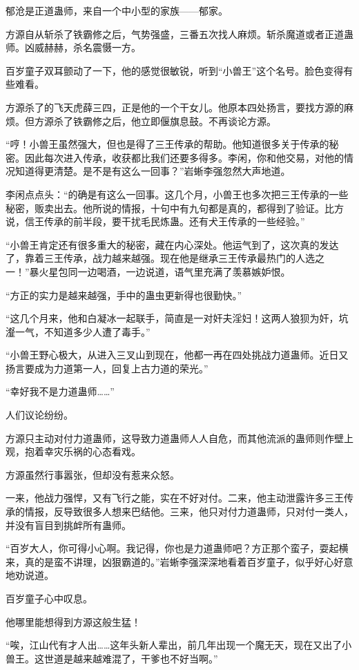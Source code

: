 \begin{this_body}
郁沧是正道蛊师，来自一个中小型的家族——郁家。

方源自从斩杀了铁霸修之后，气势强盛，三番五次找人麻烦。斩杀魔道或者正道蛊师。凶威赫赫，杀名震慑一方。

百岁童子双耳颤动了一下，他的感觉很敏锐，听到“小兽王”这个名号。脸色变得有些难看。

方源杀了的飞天虎薛三四，正是他的一个干女儿。他原本四处扬言，要找方源的麻烦。但方源杀了铁霸修之后，他立即偃旗息鼓。不再谈论方源。

“哼！小兽王虽然强大，但也是得了三王传承的帮助。他知道很多关于传承的秘密。因此每次进入传承，收获都比我们还要多得多。李闲，你和他交易，对他的情况知道得更清楚。是不是有这么一回事？”岩蜥李强忽然大声地道。

李闲点点头：“的确是有这么一回事。这几个月，小兽王也多次把三王传承的一些秘密，贩卖出去。他所说的情报，十句中有九句都是真的，都得到了验证。比方说，信王传承的前半段，要干扰毛民炼蛊。还有犬王传承的一些经验。”

“小兽王肯定还有很多重大的秘密，藏在内心深处。他运气到了，这次真的发达了，靠着三王传承，战力越来越强。现在他是继承三王传承最热门的人选之一！”暴火星包同一边喝酒，一边说道，语气里充满了羡慕嫉妒恨。

“方正的实力是越来越强，手中的蛊虫更新得也很勤快。”

“这几个月来，他和白凝冰一起联手，简直是一对奸夫淫妇！这两人狼狈为奸，坑瀣一气，不知道多少人遭了毒手。”

“小兽王野心极大，从进入三叉山到现在，他都一再在四处挑战力道蛊师。近日又扬言要成为力道第一人，回复上古力道的荣光。”

“幸好我不是力道蛊师……”

人们议论纷纷。

方源只主动对付力道蛊师，这导致力道蛊师人人自危，而其他流派的蛊师则作壁上观，抱着幸灾乐祸的心态看戏。

方源虽然行事嚣张，但却没有惹来众怒。

一来，他战力强悍，又有飞行之能，实在不好对付。二来，他主动泄露许多三王传承的情报，反导致很多人想来巴结他。三来，他只对付力道蛊师，只对付一类人，并没有盲目到挑衅所有蛊师。

“百岁大人，你可得小心啊。我记得，你也是力道蛊师吧？方正那个蛮子，耍起横来，真的是蛮不讲理，凶狠霸道的。”岩蜥李强深深地看着百岁童子，似乎好心好意地劝说道。

百岁童子心中叹息。

他哪里能想得到方源这般生猛！

“唉，江山代有才人出……这年头新人辈出，前几年出现一个魔无天，现在又出了小兽王。这世道是越来越难混了，干爹也不好当啊。”


\end{this_body}
